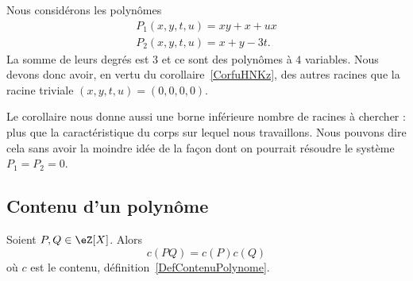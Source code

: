 \begin{example}
    Nous considérons les polynômes
    \begin{subequations}
        \begin{align}
            P_1(x,y,t,u)=xy+x+ux\\
            P_2(x,y,t,u)=x+y-3t.
        \end{align}
    \end{subequations}
    La somme de leurs degrés est \( 3\) et ce sont des polynômes à \( 4\) variables. Nous devons donc avoir, en vertu du corollaire~\ref{CorfuHNKz}, des autres racines que la racine triviale \( (x,y,t,u)=(0,0,0,0)\).

    Le corollaire nous donne aussi une borne inférieure nombre de racines à chercher : plus que la caractéristique du corps sur lequel nous travaillons. Nous pouvons dire cela sans avoir la moindre idée de la façon dont on pourrait résoudre le système \( P_1=P_2=0\).
\end{example}


\subsection{Contenu d'un polynôme}

\begin{lemma}   \label{LemHULrVaF}
    Soient \( P,Q\in \eZ[X]\). Alors
    \begin{equation}
        c(PQ)=c(P)c(Q)
    \end{equation}
    où \( c\) est le contenu, définition~\ref{DefContenuPolynome}.
\end{lemma}

